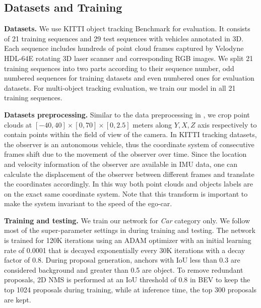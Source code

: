 \documentclass[letterpaper, 10 pt, conference]{ieeeconf}  %
\begin{document}
\subsection{Datasets and Training}

\textbf{Datasets.} We use KITTI object tracking Benchmark \cite{geiger2013vision} for evaluation. It consists of 21 training sequences and 29 test sequences with vehicles annotated in 3D. Each sequence includes hundreds of point cloud frames captured by Velodyne HDL-64E rotating 3D laser scanner and corresponding RGB images. We split 21 training sequences into two parts according to their sequence number, odd numbered sequences for training datasets and even numbered ones for evaluation datasets. For multi-object tracking evaluation, we train our model in all 21 training sequences.

\textbf{Datasets preprocessing.} Similar to the data preprocessing in \cite{ku2018joint}, we crop point clouds at $[-40, 40] \times [0, 70] \times [0, 2.5]$ meters along $Y, X, Z$ axis respectively to contain points within the field of view of the camera. In KITTI tracking datasets, the observer is an autonomous vehicle, thus the coordinate system of consecutive frames shift due to the movement of the observer over time. Since the location and velocity information of the observer are available in IMU data, one can calculate the displacement of the observer between different frames and translate the coordinates accordingly. In this way both point clouds and objects labels are on the exact same coordinate system. Note that this transform is important to make the system invariant to the speed of the ego-car.

\textbf{Training and testing.} We train our network for \textit{Car} category only. We follow most of the super-parameter settings in \cite{ku2018joint} during training and testing. The network is trained for 120K iterations using an ADAM\cite{kingma2014adam} optimizer with an initial learning rate of 0.0001 that is decayed exponentially every 30K iterations with a decay factor of 0.8. During proposal generation, anchors with IoU less than 0.3 are considered background and greater than 0.5 are object. To remove redundant proposals, 2D NMS is performed at an IoU threshold of 0.8 in BEV to keep the top 1024 proposals during training, while at inference time, the top 300 proposals are kept.
\end{document}

